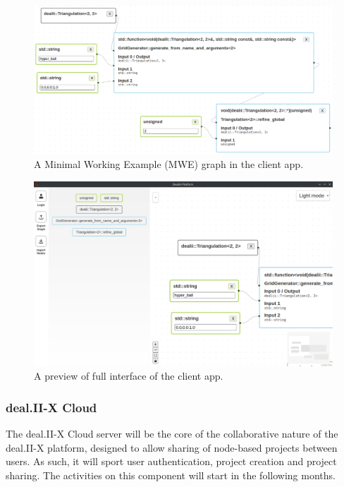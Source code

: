 \documentclass[a4paper,12pt]{article}
\begin{document}
\begin{figure}
  \centering

  \includegraphics[width=\textwidth]{dualistic-mwe.png}

  \caption{A Minimal Working Example (MWE)  graph in the client app.}
  \label{fig:dualistic-mwe}
\end{figure}

\begin{figure}
  \centering

  \includegraphics[width=\textwidth]{dualistic-interface-preview.png}

  \caption{A preview of full interface of the client app.}
  \label{fig:dualistic-interface-preview}
\end{figure}

\subsubsection{deal.II-X Cloud}

The deal.II-X Cloud server will be the core of the collaborative nature of the deal.II-X platform, designed to allow sharing of node-based projects between users.  As such, it will sport user authentication, project creation and project sharing. The activities on this component will start in the following months.
\end{document}

